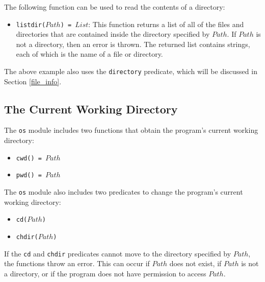 The following function can be used to read the contents of a directory:
\begin{itemize}
\item \texttt{listdir($Path$) = $List$}: This function returns a list of all of the files and directories that are contained inside the directory specified by $Path$.  If $Path$ is not a directory, then an error is thrown.  The returned list contains strings, each of which is the name of a file or directory.
\end{itemize}
The above example also uses the \texttt{directory} predicate, which will be discussed in Section \ref{file_info}.

\subsection{The Current Working Directory}
The \texttt{os} module includes two functions that obtain the program's current working directory:
\begin{itemize}
\item \texttt{cwd() = $Path$}
\item \texttt{pwd() = $Path$}
\end{itemize}

The \texttt{os} module also includes two predicates to change the program's current working directory:
\begin{itemize}
\item \texttt{cd($Path$)}
\item \texttt{chdir($Path$)}
\end{itemize}
If the \texttt{cd} and \texttt{chdir} predicates cannot move to the directory specified by $Path$, the functions throw an error.  This can occur if $Path$ does not exist, if $Path$ is not a directory, or if the program does not have permission to access $Path$.

